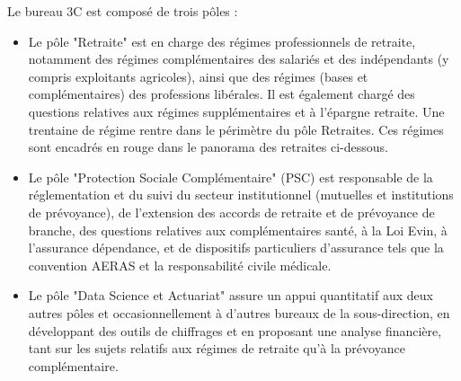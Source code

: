 Le bureau 3C est composé de trois pôles : 
\begin{itemize}
    \item  Le pôle "Retraite" est en charge des régimes professionnels de retraite, notamment des régimes complémentaires des salariés et des indépendants (y compris exploitants agricoles), ainsi que des régimes (bases et complémentaires) des professions libérales. Il est également chargé des questions relatives aux régimes supplémentaires et à l’épargne retraite. Une trentaine de régime rentre dans le périmètre du pôle Retraites. Ces régimes sont encadrés en rouge dans le panorama des retraites ci-dessous.
    \item  Le pôle "Protection Sociale Complémentaire" (PSC) est responsable de la réglementation et du suivi du secteur institutionnel (mutuelles et institutions de prévoyance), de l’extension des accords de retraite et de prévoyance de branche, des questions relatives aux complémentaires santé, à la Loi Evin, à l’assurance dépendance, et de dispositifs particuliers d’assurance tels que la convention AERAS et la responsabilité civile médicale.
    \item Le pôle "Data Science et Actuariat" assure un appui quantitatif aux deux autres pôles et occasionnellement à d'autres bureaux de la sous-direction, en développant des outils de chiffrages et en proposant une analyse financière, tant sur les sujets relatifs aux régimes de retraite qu'à la prévoyance complémentaire.
\end{itemize}

